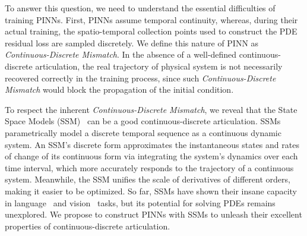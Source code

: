 To answer this question, we need to understand the essential difficulties of training PINNs.
First, PINNs assume temporal continuity, whereas, during their actual training, the spatio-temporal collection points used to construct the PDE residual loss are sampled discretely.
       We define this nature of PINN as   \textit{Continuous-Discrete Mismatch}. 
       In the absence of a well-defined continuous-discrete articulation, the real trajectory of physical system is not necessarily recovered correctly in the training process, since such \textit{Continuous-Discrete Mismatch} would block the propagation of the initial condition.


To respect the inherent \textit{Continuous-Discrete Mismatch}, we reveal that the State Space Models (SSM)~\cite{kalman1960new} can be a good continuous-discrete articulation. 
    SSMs parametrically model a discrete temporal sequence as a continuous dynamic system. An SSM's discrete form approximates the instantaneous states and rates of change of its continuous form via integrating the system's dynamics over each time interval, which more accurately responds to the trajectory of a continuous system. Meanwhile, the SSM unifies the scale of derivatives of different orders, making it easier to be optimized.    
So far, SSMs have shown their insane capacity in language~\cite{gu2023mamba} and vision~\cite{liu2024vmamba} tasks, but its potential for solving PDEs remains unexplored. We propose to construct PINNs with SSMs to unleash their excellent properties of continuous-discrete articulation.


